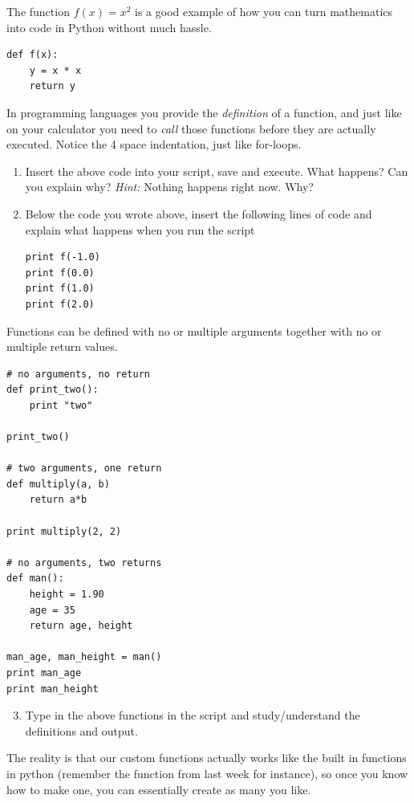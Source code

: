 \documentclass{article}
\begin{document}
The function $f(x)=x^2$ is a good example of how you can turn mathematics into code in Python without much hassle.

\begin{lstlisting}
def f(x):
    y = x * x
    return y
\end{lstlisting}

In programming languages you provide the {\em definition} of a function, and just like on your calculator you need to {\em call} those functions before they are actually executed.
Notice the 4 space indentation, just like for-loops.

\begin{enumerate}
  \item Insert the above code into your script, save and execute. What
      happens? Can you explain why? {\em Hint:} Nothing happens right now. Why?
  \item Below the code you wrote above, insert the following lines of code and
    explain what happens when you run the script

\begin{lstlisting}
print f(-1.0)
print f(0.0)
print f(1.0)
print f(2.0)
\end{lstlisting}

\end{enumerate}

Functions can be defined with no or multiple arguments together with no or multiple return values.

\begin{lstlisting}
# no arguments, no return
def print_two():
    print "two"
    
print_two()

# two arguments, one return
def multiply(a, b)
    return a*b

print multiply(2, 2)

# no arguments, two returns
def man():
    height = 1.90
    age = 35
    return age, height

man_age, man_height = man()
print man_age
print man_height

\end{lstlisting}

\begin{enumerate}
    \setcounter{enumi}{2}
    \item Type in the above functions in the script and study/understand the definitions and output.
\end{enumerate}

The reality is that our custom functions actually works like the built in functions in python (remember the  function from last week for instance), so once you know how to make one, you can essentially create as many you like.\\
\end{document}
